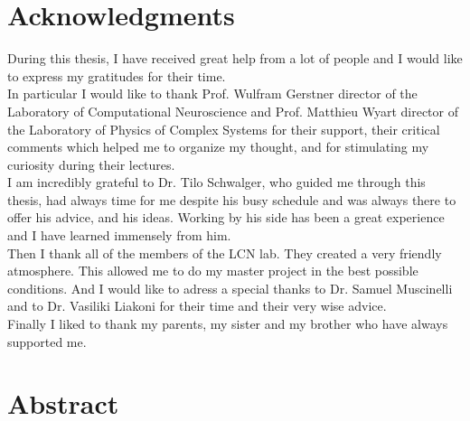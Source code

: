 \documentclass[12pt,twoside]{report}
\begin{document}
\newpage\null\thispagestyle{empty}\newpage

\chapter*{Acknowledgments}
\thispagestyle{empty}
During this thesis, I have received great help from a lot of people and I would like to express my gratitudes for their time.\\
In particular I would like to thank Prof. Wulfram Gerstner director of the Laboratory of Computational Neuroscience and Prof. Matthieu Wyart director of the Laboratory of Physics of Complex Systems for their support, their critical comments which helped me to organize my thought, and for stimulating my curiosity during their lectures.\\
I am incredibly grateful to Dr. Tilo Schwalger, who guided me through this thesis, had always time for me despite his busy schedule and was always there to offer his advice, and his ideas. Working by his side has been a great experience and I have learned immensely from him. \\
Then I thank all of the members of the LCN lab. They created a very friendly atmosphere. This allowed me to do my master project in the best possible conditions. And I would like to adress a special thanks to Dr. Samuel Muscinelli and to Dr. Vasiliki Liakoni for their time and their very wise advice.\\
Finally I liked to thank my parents, my sister and my brother who have always supported me.



\newpage\null\thispagestyle{empty}\newpage


\chapter*{Abstract}
\thispagestyle{empty}








\clearpage\newpage\null\thispagestyle{empty}\newpage


\tableofcontents
\thispagestyle{empty}


\newpage\null\thispagestyle{empty}\newpage
\end{document}

